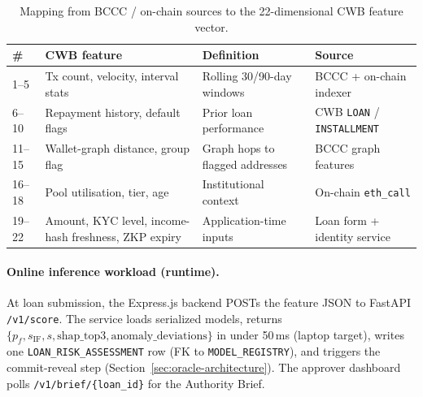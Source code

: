 \documentclass[12pt,a4paper]{report}
\newcommand{\tableheadcolor}{\rowcolor{TableHeadBg}}
\begin{document}
\begin{table}[H]
\centering
\caption[BCCC-to-CWB feature mapping (22-D)]{Mapping from BCCC / on-chain sources to the 22-dimensional CWB feature vector.}
\label{tab:ml-feature-mapping}
\footnotesize
\begin{tabular}{p{0.4cm}p{4.2cm}p{5.8cm}p{3.8cm}}
\toprule
\tableheadcolor
\textbf{\#} & \textbf{CWB feature} & \textbf{Definition} & \textbf{Source} \\
\midrule
1--5 & Tx count, velocity, interval stats & Rolling 30/90-day windows & BCCC + on-chain indexer \\
6--10 & Repayment history, default flags & Prior loan performance & CWB \texttt{LOAN} / \texttt{INSTALLMENT} \\
11--15 & Wallet-graph distance, group flag & Graph hops to flagged addresses & BCCC graph features \\
16--18 & Pool utilisation, tier, age & Institutional context & On-chain \texttt{eth\_call} \\
19--22 & Amount, KYC level, income-hash freshness, ZKP expiry & Application-time inputs & Loan form + identity service \\
\bottomrule
\end{tabular}
\end{table}

\paragraph{Online inference workload (runtime).}
At loan submission, the Express.js backend POSTs the feature JSON to FastAPI \texttt{/v1/score}. The service loads serialized models, returns $\{p_f, s_{\text{IF}}, s, \text{shap\_top3}, \text{anomaly\_deviations}\}$ in under 50\,ms (laptop target), writes one \texttt{LOAN\_RISK\_ASSESSMENT} row (FK to \texttt{MODEL\_REGISTRY}), and triggers the commit-reveal step (Section~\ref{sec:oracle-architecture}). The approver dashboard polls \texttt{/v1/brief/\{loan\_id\}} for the Authority Brief.
\end{document}
